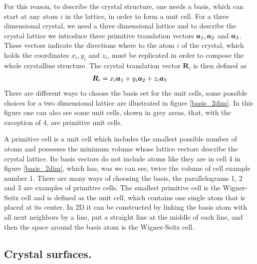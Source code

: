 	For this reason, to describe the crystal structure, one needs a basis, which can start at any atom $i$ in the lattice, in order to form a unit cell. For a three dimensional crystal, we need a three dimensional lattice and to describe the crystal lattice we introduce three primitive translation vectors $\boldsymbol{a}_1,\boldsymbol{a}_2$ and $\boldsymbol{a}_3$. These vectors indicate the directions where to the atom $i$ of the crystal, which holds the coordinates $x_i, y_i $ and $z_i$, must be replicated in order to compose the whole crystalline structure. The crystal translation vector $\boldsymbol{R}_i$ is then defined as 
	\begin{equation} \label{vector}
		\boldsymbol{R}_i = x_i \boldsymbol{a}_1 + y_i \boldsymbol{a}_2 + z_i \boldsymbol{a}_3
	\end{equation}
	There are different ways to choose the basis set for the unit cells, some possible choices for a two dimensional lattice are illustrated in figure \ref{basis_2dim}. In this figure one can also see some unit cells, shown in grey areas, that, with the exception of 4, are primitive unit cells.
	
	A primitive cell is a unit cell which includes the smallest possible number of atoms and possesses the minimum volume whose lattice vectors describe the crystal lattice.  
	Its basis vectors do not include atoms like they are in cell 4 in figure \ref{basis_2dim},
	which has, was we can see, twice the volume of cell example number 1.
	There are many ways of choosing the basis, the parallelograms 1, 2 and 3 are examples of primitive cells. 
	The smallest primitive cell is the Wigner-Seitz cell and is defined as the unit cell, which contains one single atom that is placed at its center. In 2D it can be constructed by linking the basis atom with all next neighbors by a line, put a straight line at the middle of each line, and then the space around the basis atom is the Wigner-Seitz cell. 
\subsection{Crystal surfaces.}	
